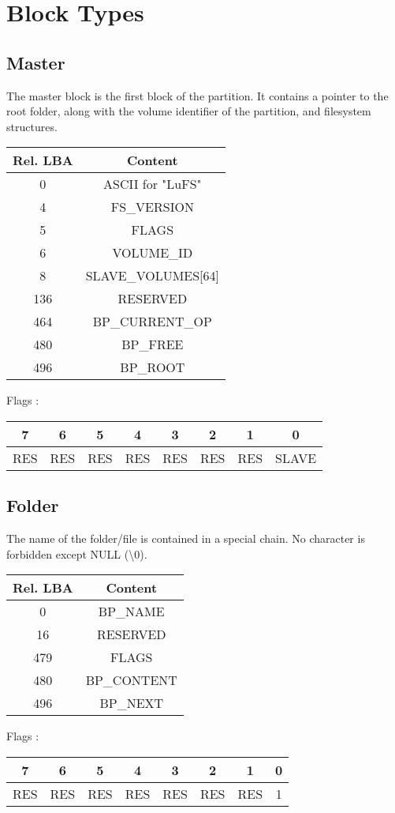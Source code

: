 \documentclass{article}
\begin{document}
\section{Block Types}
\subsection{Master}
The master block is the first block of the partition. It contains a pointer to the root folder, along with the volume identifier of the partition, and filesystem structures.
\newline
\begin{tabular}{|c|c|}
  \hline
  Rel. LBA & Content \\
  \hline
  0 & ASCII for "LuFS"  \\
  \hline
  4 &  FS\_VERSION \\
  \hline
  5 &  FLAGS \\
  \hline
  6 &  VOLUME\_ID \\
  \hline
  8 &  SLAVE\_VOLUMES[64] \\
  \hline
  136 & RESERVED \\
  \hline
  464 & BP\_CURRENT\_OP \\
  \hline
  480 & BP\_FREE \\
  \hline
  496 & BP\_ROOT \\
  \hline
  
\end{tabular}
\newline
Flags :
\begin{tabular}{|c|c|c|c|c|c|c|c|}
  \hline
  7 & 6 & 5 & 4 & 3 & 2 & 1 & 0 \\
  \hline
  RES & RES & RES & RES & RES & RES & RES & SLAVE  \\
  \hline
\end{tabular}
\subsection{Folder}
The name of the folder/file is contained in a special chain. No character is forbidden except NULL (\textbackslash0).
\newline
\begin{tabular}{|c|c|}
  \hline
  Rel. LBA & Content \\
  \hline
  0 & BP\_NAME \\
  \hline
  16 &  RESERVED \\
  \hline
  479 &  FLAGS \\
  \hline
  480 & BP\_CONTENT \\
  \hline
  496 & BP\_NEXT \\
  \hline
  
\end{tabular}
\newline
Flags :
\begin{tabular}{|c|c|c|c|c|c|c|c|}
  \hline
  7 & 6 & 5 & 4 & 3 & 2 & 1 & 0 \\
  \hline
  RES & RES & RES & RES & RES & RES & RES & 1  \\
  \hline
\end{tabular}
\end{document}

